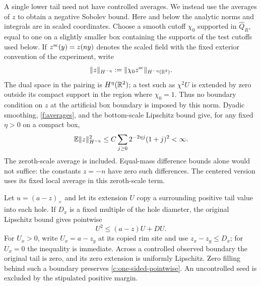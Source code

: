 A single lower tail need not have controlled averages. We instead use
the averages of $z$ to obtain a negative Sobolev bound. Here and below
the analytic norms and integrals are in scaled coordinates. Choose
a smooth cutoff $\chi_0$ supported in $\widehat Q_R$, equal to one
on a slightly smaller box containing the supports of the test
cutoffs used below. If $z^{\rm sc}(y)=z(ny)$ denotes the scaled
field with the fixed exterior convention of the experiment, write
\[
 \|z\|_{H^{-\eta}}
 :=\|\chi_0 z^{\rm sc}\|_{H^{-\eta}(\mathbb R^2)}.
\]
The dual space in the pairing is $H^\eta(\mathbb R^2)$; a test such as
$\chi^2U$ is extended by zero outside its compact support in the
region where $\chi_0=1$. Thus no boundary condition on $z$ at the
artificial box boundary is imposed by this norm. Dyadic smoothing,
\ref{f:averages}, and the bottom-scale Lipschitz bound give, for any
fixed $\eta>0$ on a compact box,
\begin{equation}\label{c:negative}
 \mathbb E\|z\|_{H^{-\eta}}^2
 \le C\sum_{j\ge0}2^{-2\eta j}(1+j)^2<\infty.
\end{equation}
The zeroth-scale average is included. Equal-mass difference bounds
alone would not suffice: the constants $z=-n$ have zero such
differences. The centered version uses its fixed local average in
this zeroth-scale term.

Let $u=(a-z)_+$ and let its extension $U$ copy a surrounding positive
tail value into each hole. If $D_x$ is a fixed multiple of the hole
diameter, the original Lipschitz bound gives pointwise
\begin{equation}\label{c:one-sided-pointwise}
 U^2\le(a-z)U+DU.
\end{equation}
For $U_x>0$, write $U_x=a-z_y$ at its copied rim site and use
$z_x-z_y\le D_x$; for $U_x=0$ the inequality is immediate.
Across a controlled observed boundary the original tail is zero,
and its zero extension is uniformly Lipschitz. Zero filling behind
such a boundary preserves \eqref{c:one-sided-pointwise}. An
uncontrolled seed is excluded by the stipulated positive margin.

